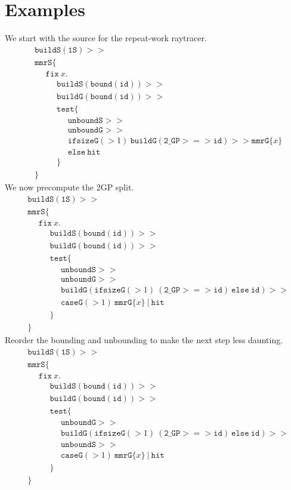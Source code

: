 \documentclass{article}
\newcommand {\fix}{\mathtt{fix}}
\newcommand {\test}{\mathtt{test}}
\newcommand {\isect}{\mathtt{hit}}
\newcommand {\buildG}{\mathtt{buildG}}
\newcommand {\buildS}{\mathtt{buildS}}
\newcommand {\id}{\mathtt{id}}
\newcommand {\unboundG}{\mathtt{unboundG}}
\newcommand {\unboundS}{\mathtt{unboundS}}
\newcommand {\mmrG}{\mathtt{mmrG}}
\newcommand {\mmrS}{\mathtt{mmrS}}
\newcommand {\oneS}{\mathtt{1S}}
\newcommand {\twoGP}{\mathtt{2\_GP}}
\newcommand {\bound}{\mathtt{bound}}
\newcommand {\normalSpacing}{\setlength{\jot}{1ex}}
\newcommand {\tab}{~~~~~~}
\begin{document}
\section{Examples}
\normalSpacing
We start with the source for the repeat-work raytracer.
\begin{align*}
&\buildS (\oneS) >> \\
&\mmrS \{ \\
&\tab\fix~x. \\
&\tab\tab \buildS(\bound (\mathtt{id})) >> \\
&\tab\tab \buildG(\bound (\mathtt{id})) >> \\
&\tab\tab\test \{ \\
&\tab\tab\tab \unboundS >> \\
&\tab\tab\tab \unboundG >> \\
&\tab\tab\tab \mathtt{ifsizeG}(>1)~\buildG (\twoGP >=> \id) >> \mmrG \{x\} \\
&\tab\tab\tab \mathtt{else}~\isect \\
&\tab \tab \} \\
&\}
\end{align*}
We now precompute the 2GP split.
\begin{align*}
&\buildS (\oneS) >> \\
&\mmrS \{ \\
&\tab\fix~x. \\
&\tab\tab \buildS(\bound (\mathtt{id})) >> \\
&\tab\tab \buildG(\bound (\mathtt{id})) >> \\
&\tab\tab\test \{ \\
&\tab\tab\tab \unboundS >> \\
&\tab\tab\tab \unboundG >> \\
&\tab\tab\tab \buildG (\mathtt{ifsizeG}(>1)~(\twoGP >=> \id)~\mathtt{else}~\id) >> \\
&\tab\tab\tab \mathtt{caseG}(>1)~\mmrG \{x\}~|~\isect\\
&\tab \tab \} \\
&\}
\end{align*}
Reorder the bounding and unbounding to make the next step less daunting.
\begin{align*}
&\buildS (\oneS) >> \\
&\mmrS \{ \\
&\tab\fix~x. \\
&\tab\tab \buildS(\bound (\mathtt{id})) >> \\
&\tab\tab \buildG(\bound (\mathtt{id})) >> \\
&\tab\tab\test \{ \\
&\tab\tab\tab \unboundG >> \\
&\tab\tab\tab \buildG (\mathtt{ifsizeG}(>1)~(\twoGP >=> \id)~\mathtt{else}~\id) >> \\
&\tab\tab\tab \unboundS >> \\
&\tab\tab\tab \mathtt{caseG}(>1)~\mmrG \{x\}~|~\isect\\
&\tab \tab \} \\
&\}
\end{align*}
\end{document}
